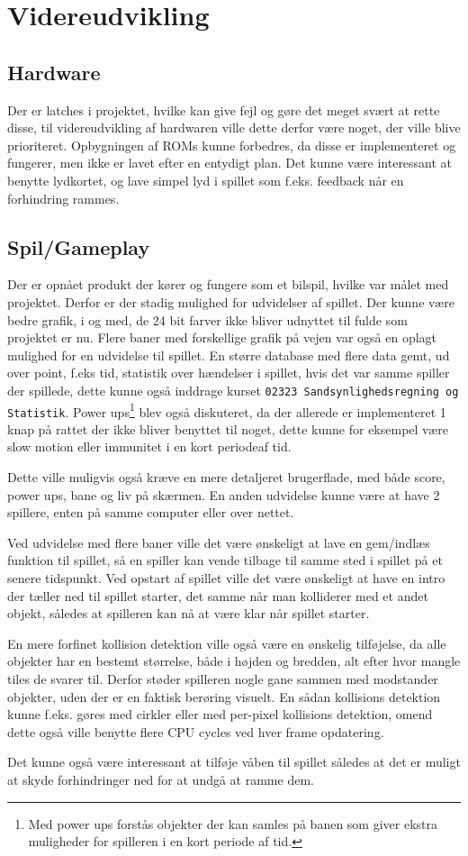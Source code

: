 \section{Videreudvikling}
\subsection{Hardware}
Der er latches i projektet, hvilke kan give fejl og gøre det meget svært at rette disse, til videreudvikling af hardwaren ville dette derfor være noget, der ville blive prioriteret. Opbygningen af ROMs kunne forbedres, da disse er implementeret og fungerer, men ikke er lavet efter en entydigt plan. Det kunne være interessant at benytte lydkortet, og lave simpel lyd i spillet som f.eks. feedback når en forhindring rammes.

\subsection{Spil/Gameplay}
Der er opnået produkt der kører og fungere som et bilspil, hvilke var målet med projektet. Derfor er der stadig mulighed for udvidelser af spillet.
Der kunne være bedre grafik, i og med, de 24 bit farver ikke bliver udnyttet til fulde som projektet er nu.
Flere baner med forskellige grafik på vejen var også en oplagt mulighed for en udvidelse til spillet.
En større database med flere data gemt, ud over point, f.eks tid, statistik over hændelser i spillet, hvis det var samme spiller der spillede, dette kunne også inddrage kurset \texttt{02323 Sandsynlighedsregning og Statistik}.
Power ups\footnote{Med power ups forstås objekter der kan samles på banen som giver ekstra muligheder for spilleren i en kort periode af tid.} blev også diskuteret, da der allerede er implementeret 1 knap på rattet der ikke bliver benyttet til noget, dette kunne for eksempel være slow motion eller immunitet i en kort periodeaf tid.

Dette ville muligvis også kræve en mere detaljeret brugerflade, med både score, power ups, bane og liv på skærmen. En anden udvidelse kunne være at have 2 spillere, enten på samme computer eller over nettet.

Ved udvidelse med flere baner ville det være ønskeligt at lave en gem/indlæs funktion til spillet, så en spiller kan vende tilbage til samme sted i spillet på et senere tidspunkt. Ved opstart af spillet ville det være ønskeligt at have en intro der tæller ned til spillet starter, det samme når man kolliderer med et andet objekt, således at spilleren kan nå at være klar når spillet starter.

En mere forfinet kollision detektion ville også være en ønskelig tilføjelse, da alle objekter har en bestemt størrelse, både i højden og bredden, alt efter hvor mangle tiles de svarer til. Derfor støder spilleren nogle gane sammen med modstander objekter, uden der er en faktisk berøring visuelt. En sådan kollisions detektion kunne f.eks. gøres med cirkler eller med per-pixel kollisions detektion, omend dette også ville benytte flere CPU cycles ved hver frame opdatering.

Det kunne også være interessant at tilføje våben til spillet således at det er muligt at skyde forhindringer ned for at undgå at ramme dem.
